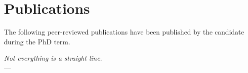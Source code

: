 
{}
\chapter*{Publications}

\manualmark
{}

\noindent The following peer-reviewed publications have been published by the candidate during the PhD term.
%
\begin{refsection}
    \nocite{*} %
    \printbibliography[heading=none,keyword=own]
\end{refsection}

\begin{flushright}{\slshape
    Not everything is a straight line.} \\ \medskip
    --- \cite{tukey_exploratory_1977}
\end{flushright}

\vfill
